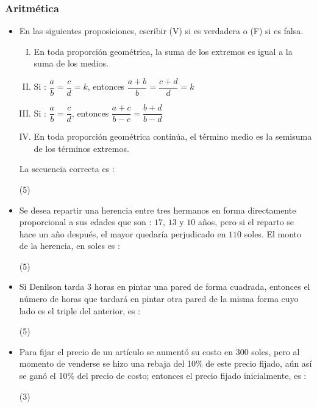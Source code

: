 \documentclass[10pt, twocolumn, landscape, a4paper]{article}
\begin{document}
\subsubsection*{Aritmética}
\begin{itemize}
\item{En las siguientes proposiciones, escribir (\textrm{V}) si es verdadera o (\textrm{F}) si es falsa. 
\begin{enumerate}[I.]
\item{En toda proporción geométrica, la suma de los extremos es igual a la suma de los medios.}
\item{Si : $\dfrac{a}{b} = \dfrac{c}{d} = k$, entonces $\dfrac{a + b}{b} = \dfrac{c + d}{d} = k$}
\item{Si : $\dfrac{a}{b} = \dfrac{c}{d}$, entonces $\dfrac{a + c}{b - c} = \dfrac{b + d}{b - d}$}
\item{En toda proporción geométrica continúa, el término medio es la semisuma de los términos extremos.}
\end{enumerate}
La secuencia correcta es :
\begin{tasks}(5)
\end{tasks}
}
\item{Se desea repartir una herencia entre tres hermanos en forma directamente proporcional a sus edades que son : $17$, $13$ y $10$ años, pero si el reparto se hace un año después, el mayor quedaría perjudicado en $110$ soles. El monto de la herencia, en soles es :
\begin{tasks}(5)
\end{tasks}
}
\item{Si Denilson tarda $3$ horas en pintar una pared de forma cuadrada, entonces el número de horas que tardará en pintar otra pared de la misma forma cuyo lado es el triple del anterior, es :
\begin{tasks}(5)
\end{tasks}
}
\item{Para fijar el precio de un artículo se aumentó su costo en $300$ soles, pero al momento de venderse se hizo una rebaja del 10\% de este precio fijado, aún así se ganó el 10\% del precio de costo; entonces el precio fijado inicialmente, es : 
\begin{tasks}(3)
\end{tasks}
}
\end{itemize}
\end{document}
